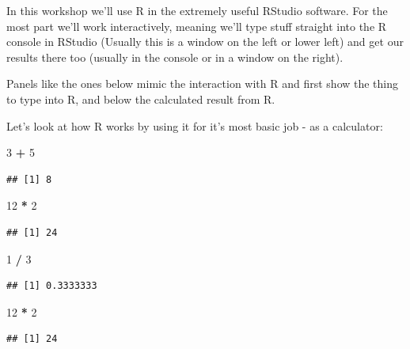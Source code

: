 \documentclass[
]{book}
\newenvironment{Shaded}{\begin{snugshade}}{\end{snugshade}}
\newcommand{\DecValTok}[1]{\textcolor[rgb]{0.00,0.00,0.81}{#1}}
\newcommand{\OperatorTok}[1]{\textcolor[rgb]{0.81,0.36,0.00}{\textbf{#1}}}
\newcommand{\StringTok}[1]{\textcolor[rgb]{0.31,0.60,0.02}{#1}}
\begin{document}
In this workshop we'll use R in the extremely useful RStudio software. For the most part we'll work interactively, meaning we'll type stuff straight into the R console in RStudio (Usually this is a window on the left or lower left) and get our results there too (usually in the console or in a window on the right).

Panels like the ones below mimic the interaction with R and first show the thing to type into R, and below the calculated result from R.

Let's look at how R works by using it for it's most basic job - as a calculator:

\begin{Shaded}
\begin{Highlighting}[]
 \DecValTok{3} \OperatorTok{+}\StringTok{ }\DecValTok{5}
\end{Highlighting}
\end{Shaded}

\begin{verbatim}
## [1] 8
\end{verbatim}

\begin{Shaded}
\begin{Highlighting}[]
 \DecValTok{12} \OperatorTok{*}\StringTok{ }\DecValTok{2}
\end{Highlighting}
\end{Shaded}

\begin{verbatim}
## [1] 24
\end{verbatim}

\begin{Shaded}
\begin{Highlighting}[]
 \DecValTok{1} \OperatorTok{/}\StringTok{ }\DecValTok{3}
\end{Highlighting}
\end{Shaded}

\begin{verbatim}
## [1] 0.3333333
\end{verbatim}

\begin{Shaded}
\begin{Highlighting}[]
 \DecValTok{12} \OperatorTok{*}\StringTok{ }\DecValTok{2}
\end{Highlighting}
\end{Shaded}

\begin{verbatim}
## [1] 24
\end{verbatim}
\end{document}
